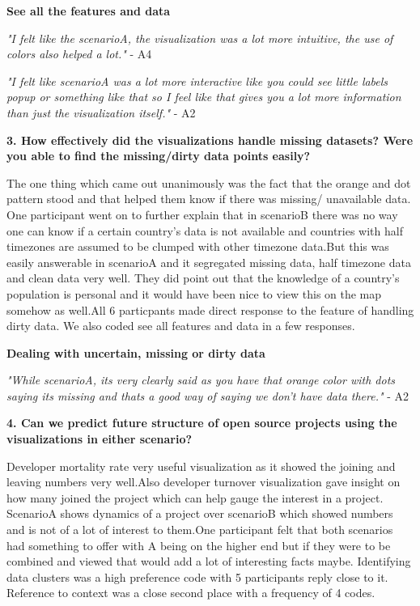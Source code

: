 \documentclass[double,12pt]{beavtex}
\begin{document}
\textbf{See all the features and data}

{\em "I felt like the scenarioA, the visualization was a lot more intuitive, the use of colors also helped a lot."} - A4

{\em "I felt like scenarioA was a lot more interactive like you could see little labels popup or something like that so I feel like that gives you a lot more information than just the visualization itself."} - A2

\textbf{3. How effectively did the visualizations handle missing datasets? Were you able to find the missing/dirty data points easily?}

The one thing which came out unanimously was the fact that the orange and dot pattern stood and that helped them know if there was missing/ unavailable data. One participant went on to further explain that in scenarioB there was no way one can know if a certain country's data is not available and countries with half timezones are assumed to be clumped with other timezone data.But this was easily answerable in scenarioA and it segregated missing data, half timezone data and clean data very well. They did point out that the knowledge of a country's population is personal and it would have been nice to view this on the map somehow as well.All 6 particpants made direct response to the feature of handling dirty data. We also coded see all features and data in a few responses.

\textbf{Dealing with uncertain, missing or dirty data}

{\em "While scenarioA, its very clearly said as you have that orange color with dots saying its missing and thats a good way of saying we don't have data there."} - A2

\textbf{4. Can we predict future structure of open source projects using the visualizations in either scenario?}

Developer mortality rate very useful visualization as it showed the joining and leaving numbers very well.Also developer turnover visualization gave insight on how many joined the project which can help gauge the interest in a project. ScenarioA shows dynamics of a project over scenarioB which showed numbers and is not of a lot of interest to them.One participant felt that both scenarios had something to offer with A being on the higher end but if they were to be combined and viewed that would add a lot of interesting facts maybe. Identifying data clusters was a high preference code with 5 participants reply close to it. Reference to context was a close second place with a frequency of 4 codes.
\end{document}

